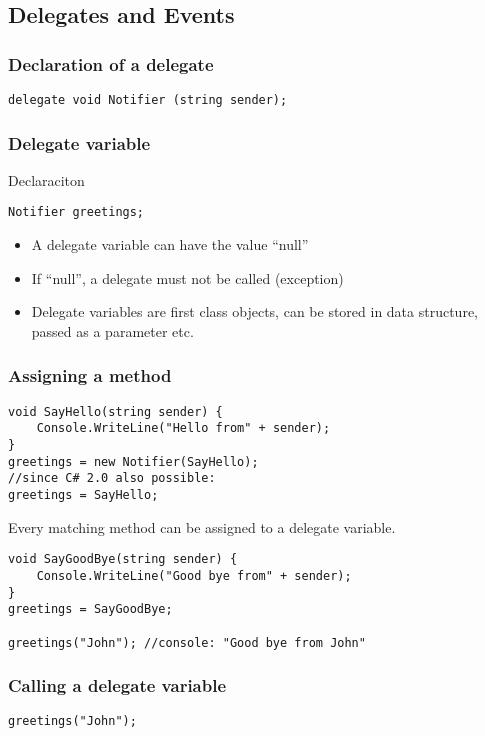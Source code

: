 \subsection{Delegates and Events}
\subsubsection{Declaration of a delegate}
\begin{lstlisting}
delegate void Notifier (string sender);
\end{lstlisting}

\subsubsection{Delegate variable}
Declaraciton
\begin{lstlisting}
Notifier greetings;
\end{lstlisting}
\begin{itemize}
  \item A delegate variable can have the value "`null"'
  \item If "`null"', a delegate must not be called (exception)
  \item Delegate variables are first class objects, can be stored in data
  structure, passed as a parameter etc.
\end{itemize}

\subsubsection{Assigning a method}
\begin{lstlisting}
void SayHello(string sender) {
	Console.WriteLine("Hello from" + sender);
}
greetings = new Notifier(SayHello);
//since C# 2.0 also possible:
greetings = SayHello;
\end{lstlisting}
Every matching method can be assigned to a delegate variable.
\begin{lstlisting}
void SayGoodBye(string sender) {
	Console.WriteLine("Good bye from" + sender);
}
greetings = SayGoodBye;

greetings("John"); //console: "Good bye from John"
\end{lstlisting}

\subsubsection{Calling a delegate variable}
\begin{lstlisting}
greetings("John");
\end{lstlisting}

